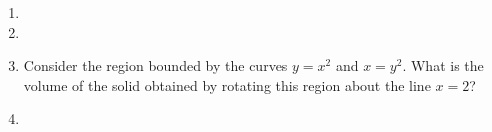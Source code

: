 \begin{enumerate}[ref={\fcProblemRef}]
\item 
 
\item  
\item Consider the region bounded by the curves $y = x^2$ and $x = y^2$. What is the volume of the solid obtained by
rotating this region about the line $x = 2$?

\item 


\end{enumerate}
